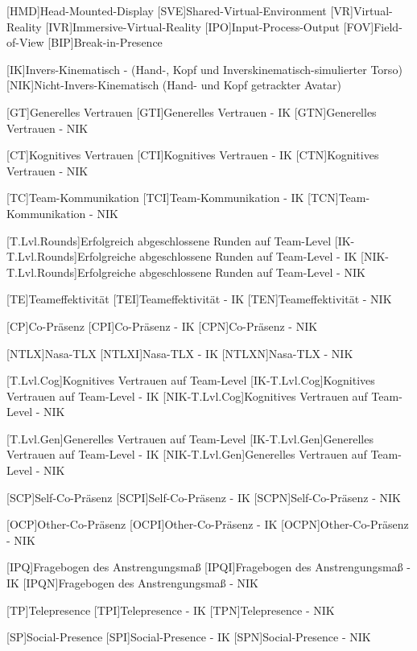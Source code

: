 \begin{acronym}
	[HMD]{Head-Mounted-Display}
	[SVE]{Shared-Virtual-Environment}
	[VR]{Virtual-Reality}
	[IVR]{Immersive-Virtual-Reality}
	[IPO]{Input-Process-Output}
	[FOV]{Field-of-View}
	[BIP]{Break-in-Presence}
	
	[IK]{Invers-Kinematisch - (Hand-, Kopf und Inverskinematisch-simulierter Torso)}
	[NIK]{Nicht-Invers-Kinematisch (Hand- und Kopf getrackter Avatar)}
	
	[GT]{Generelles Vertrauen}
	[GTI]{Generelles Vertrauen - IK}
	[GTN]{Generelles Vertrauen - NIK}
	
	[CT]{Kognitives Vertrauen}
	[CTI]{Kognitives Vertrauen - IK}
	[CTN]{Kognitives Vertrauen - NIK}
	
	[TC]{Team-Kommunikation}
	[TCI]{Team-Kommunikation - IK}
	[TCN]{Team-Kommunikation - NIK}
	
	[T.Lvl.Rounds]{Erfolgreich abgeschlossene Runden auf Team-Level}
	[IK-T.Lvl.Rounds]{Erfolgreiche abgeschlossene Runden auf Team-Level - IK}
	[NIK-T.Lvl.Rounds]{Erfolgreiche abgeschlossene Runden auf Team-Level - NIK}
	
	[TE]{Teameffektivität}
	[TEI]{Teameffektivität - IK}
	[TEN]{Teameffektivität - NIK}
	
	[CP]{Co-Präsenz}
	[CPI]{Co-Präsenz - IK}
	[CPN]{Co-Präsenz - NIK}
	
	[NTLX]{Nasa-TLX}
	[NTLXI]{Nasa-TLX - IK}
	[NTLXN]{Nasa-TLX - NIK}
	
	[T.Lvl.Cog]{Kognitives Vertrauen auf Team-Level}
	[IK-T.Lvl.Cog]{Kognitives Vertrauen auf Team-Level - IK}
	[NIK-T.Lvl.Cog]{Kognitives Vertrauen auf Team-Level - NIK}
	
	[T.Lvl.Gen]{Generelles Vertrauen auf Team-Level}
	[IK-T.Lvl.Gen]{Generelles Vertrauen auf Team-Level - IK}
	[NIK-T.Lvl.Gen]{Generelles Vertrauen auf Team-Level - NIK}
	
	[SCP]{Self-Co-Präsenz}
	[SCPI]{Self-Co-Präsenz - IK}
	[SCPN]{Self-Co-Präsenz - NIK}	
	
	[OCP]{Other-Co-Präsenz}
	[OCPI]{Other-Co-Präsenz - IK}
	[OCPN]{Other-Co-Präsenz - NIK}	
	
	[IPQ]{Fragebogen des Anstrengungsmaß}
	[IPQI]{Fragebogen des Anstrengungsmaß - IK}
	[IPQN]{Fragebogen des Anstrengungsmaß - NIK}
	
	[TP]{Telepresence}
	[TPI]{Telepresence - IK}
	[TPN]{Telepresence - NIK}	
	
	[SP]{Social-Presence}
	[SPI]{Social-Presence - IK}
	[SPN]{Social-Presence - NIK}
\end{acronym}
